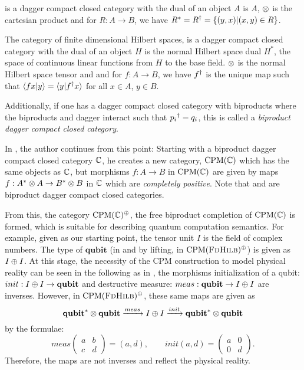 \begin{example}[\rel] 
  \rel is a dagger compact closed category with the dual of an object $A$ is $A$, $\otimes$ is the
  cartesian product and for $R:A\to B$, we have ${R}^{*} = {R}^{\dagger} = \{(y,x) | (x,y) \in R\}$.
\end{example}
\begin{example}[\fdh] 
  The category of finite dimensional Hilbert spaces, \fdh is a dagger compact closed category with
  the dual of an object $H$ is the normal Hilbert space dual $H^{*}$, the space of continuous
  linear functions from $H$ to the base field. $\otimes$ is the normal Hilbert space tensor and and for
  $f:A\to B$, we have ${f}^{\dagger}$ is the unique map such that $\langle f x | y \rangle = \langle y |
  {f}^{\dagger}x \rangle$ for all $x\in A$, $y \in B$.
\end{example}

Additionally, if one has a dagger compact closed category with biproducts where the biproducts and
dagger interact such that ${p_i}^{\dagger} = q_i$, this is called a \emph{biproduct dagger compact closed
category}.

In \cite{selinger05:dagger}, the author continues from this point: Starting with a biproduct dagger
compact closed category $\mathbb{C}$, he creates a new category, $\text{CPM}(\mathbb{C})$ which has the same
objects as $\mathbb{C}$, but morphisms $f:A \to B$ in $\text{CPM}(\mathbb{C})$ are given by maps $f:{A}^{*} \otimes A
\to {B}^{*} \otimes B$ in $\mathbb{C}$ which are \emph{completely positive}. Note that \rel and \fdh are
biproduct dagger compact closed categories.

From this, the category $\text{CPM}(\mathbb{C})^{\oplus}$, the free biproduct completion of $\text{CPM}(\mathbb{C})$ is
formed, which is suitable for describing quantum computation semantics. For example, given \fdh as
our starting point, the tensor unit $I$ is the field of complex numbers. The type of
$\mathbf{qubit}$ (in \fdh and by lifting, in $\text{CPM}(\textsc{FdHilb})^{\oplus}$) is given as $I\oplus I$. At this
stage, the necessity of the CPM construction to model physical reality can be seen in the following
as in \fdh, the morphisms initialization of a qubit: $init:I\oplus I \to \mathbf{qubit}$ and destructive
measure: $meas: \mathbf{qubit} \to I\oplus I$ are inverses. However, in $\text{CPM}(\textsc{FdHilb})^{\oplus}$, these
same maps are given as
\[
  {\mathbf{qubit}}^{*} \otimes \mathbf{qubit} \xrightarrow{meas} I\oplus
    I \xrightarrow{init}{\mathbf{qubit}}^{*} \otimes \mathbf{qubit} 
\]
by the formulae:
\[
  meas
  \begin{pmatrix}
    a & b \\ 
    c & d
  \end{pmatrix}
  = (a,d), \qquad init(a,d) =
  \begin{pmatrix}
    a &0 \\ 
    0 & d
  \end{pmatrix}.
\]
Therefore, the maps are not inverses and reflect the physical reality.


